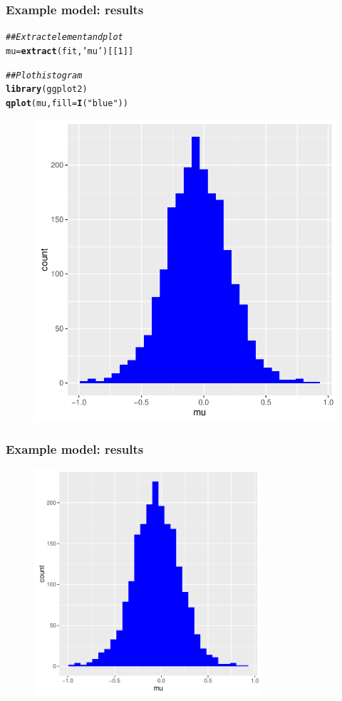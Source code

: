 \documentclass[handout]{beamer}
\makeatletter
\newcommand{\hlnum}[1]{\textcolor[rgb]{0.686,0.059,0.569}{#1}}%
\newcommand{\hlstr}[1]{\textcolor[rgb]{0.192,0.494,0.8}{#1}}%
\newcommand{\hlcom}[1]{\textcolor[rgb]{0.678,0.584,0.686}{\textit{#1}}}%
\newcommand{\hlstd}[1]{\textcolor[rgb]{0.345,0.345,0.345}{#1}}%
\newcommand{\hlkwb}[1]{\textcolor[rgb]{0.69,0.353,0.396}{#1}}%
\newcommand{\hlkwc}[1]{\textcolor[rgb]{0.333,0.667,0.333}{#1}}%
\newcommand{\hlkwd}[1]{\textcolor[rgb]{0.737,0.353,0.396}{\textbf{#1}}}%
\newenvironment{kframe}{%
	\def\at@end@of@kframe{}%
	\ifinner\ifhmode%
	\def\at@end@of@kframe{\end{minipage}}%
\begin{minipage}{\columnwidth}%
	\fi\fi%
	\def\FrameCommand##1{\hskip\@totalleftmargin \hskip-\fboxsep
		\colorbox{shadecolor}{##1}\hskip-\fboxsep
		\hskip-\linewidth \hskip-\@totalleftmargin \hskip\columnwidth}%
	\MakeFramed {\advance\hsize-\width
		\@totalleftmargin\z@ \linewidth\hsize
		\@setminipage}}%
{\par\unskip\endMakeFramed%
	\at@end@of@kframe}
\newenvironment{knitrout}{}{} %
\makeatother
\begin{document}
\begin{frame}[fragile]
\frametitle{Example model: results}
	\begin{knitrout}\small
		\color{fgcolor}\begin{kframe}
			\begin{alltt}
				\hlcom{## Extract element and plot}
				\hlstd{mu} \hlkwb{=} \hlkwd{extract}\hlstd{(fit,}\hlstr{'mu'}\hlstd{)[[}\hlnum{1}\hlstd{]]}
				
				\hlcom{## Plot histogram}
				\hlkwd{library}\hlstd{(ggplot2)}
				\hlkwd{qplot}\hlstd{(mu,} \hlkwc{fill}\hlstd{=}\hlkwd{I}\hlstd{(}\hlstr{"blue"}\hlstd{))}
			\end{alltt}
\end{kframe}
		
		
	\end{knitrout}
	
	\begin{figure}[ht]
		\centerline{\includegraphics[width=.4\linewidth]{./Figures/boring-plots1-1.pdf} }
	\end{figure}
	
\end{frame}

\begin{frame}
	\frametitle{Example model: results}
\begin{figure}[ht]
	\centerline{\includegraphics[width=0.75\textwidth]{./Figures/boring-plots1-1.pdf}}
\end{figure}
\end{frame}
\end{document}
